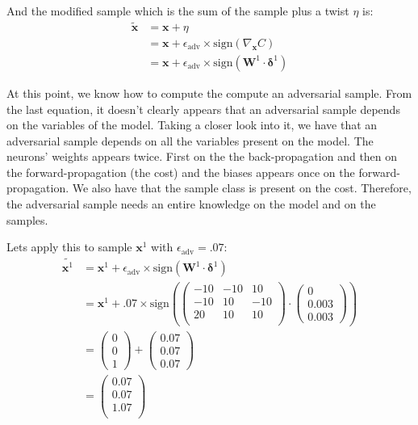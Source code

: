 		And the modified sample which is the sum of the sample plus a twist $\eta$ is:
		\begin{equation}
			\begin{split}
				\tilde{\boldsymbol{x}}
				&= \boldsymbol{x} + \eta \\
				&= \boldsymbol{x} + \epsilon_{\text{adv}} \times \text{sign}(\nabla_{\boldsymbol{x}} C) \\
				&= \boldsymbol{x} + \epsilon_{\text{adv}} \times \text{sign}( \boldsymbol{W}^1 \cdot \boldsymbol{\delta}^1 )
			\end{split}
			\label{eq:sample_twist}
		\end{equation}

		At this point, we know how to compute the compute an adversarial sample. From the last equation, it doesn't clearly appears that an adversarial sample depends on the variables of the model. Taking a closer look into it, we have that an adversarial sample depends on all the variables present on the model. The neurons' weights appears twice. First on the the back-propagation and then on the forward-propagation (the cost) and the biases appears once on the forward-propagation. We also have that the sample class is present on the cost. Therefore, the adversarial sample needs an entire knowledge on the model and on the samples.

		Lets apply this to sample $\boldsymbol{x}^1$ with $\epsilon_{\text{adv}} = .07$:
		\begin{equation}
			\begin{split}
				\widetilde{\boldsymbol{x}^1}
				&= \boldsymbol{x}^1 + \epsilon_{\text{adv}} \times \text{sign}( \boldsymbol{W}^1 \cdot \boldsymbol{\delta}^1 ) \\
				&= \boldsymbol{x}^1 + .07 \times \text{sign}
				\left( \left( \begin{matrix}
				-10 	& -10 	& 10 \\
				-10 	& 10 	& -10 \\
				20 		& 10 	& 10 \\
				\end{matrix} \right) \cdot
				\left( \begin{matrix}0 \\ 0.003 \\0.003  \end{matrix} \right) \right)\\
				&= \left( \begin{matrix} 0 \\   0 \\ 1  \end{matrix} \right) +
				\left( \begin{matrix}0.07 \\0.07 \\0.07 \end{matrix} \right) \\
				&= \left( \begin{matrix}0.07 \\0.07 \\1.07 \\\end{matrix} \right)
			\end{split}
		\end{equation}

